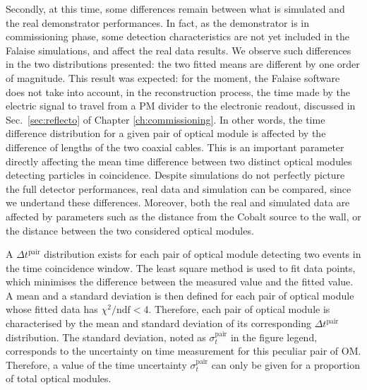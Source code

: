 Secondly, at this time, some differences remain between what is simulated and the real demonstrator performances.
In fact, as the demonstrator is in commissioning phase, some detection characteristics are not yet included in the Falaise simulations, and affect the real data results.
We observe such differences in the two distributions presented: the two fitted means are different by one order of magnitude.
This result was expected: for the moment, the Falaise software does not take into account, in the reconstruction process, the time made by the electric signal to travel from a PM divider to the electronic readout, discussed in Sec.~\ref{sec:reflecto} of Chapter \ref{ch:commissioning}.
In other words, the time difference distribution for a given pair of optical module is affected by the difference of lengths of the two coaxial cables.
This is an important parameter directly affecting the mean time difference between two distinct optical modules detecting particles in coincidence.
Despite simulations do not perfectly picture the full detector performances, real data and simulation can be compared, since we undertand these differences.
Moreover, both the real and simulated data are affected by parameters such as the distance from the Cobalt source to the wall, or the distance between the two considered optical modules.

A $\Delta t^{\text{pair}}$ distribution exists for each pair of optical module detecting two events in the time coincidence window.
The least square method is used to fit data points, which minimises the difference between the measured value and the fitted value.
A mean and a standard deviation is then defined for each pair of optical module whose fitted data has $\chi^{2}/\text{ndf}<4$.
Therefore, each pair of optical module is characterised by the mean and standard deviation of its corresponding $\Delta t^{\text{pair}}$ distribution.
The standard deviation, noted as $\sigma_{t}^{\text{pair}}$ in the figure legend, corresponds to the uncertainty on time measurement for this peculiar pair of OM.
Therefore, a value of the time uncertainty $\sigma_{t}^{\text{pair}}$ can only be given for a proportion of total optical modules.

